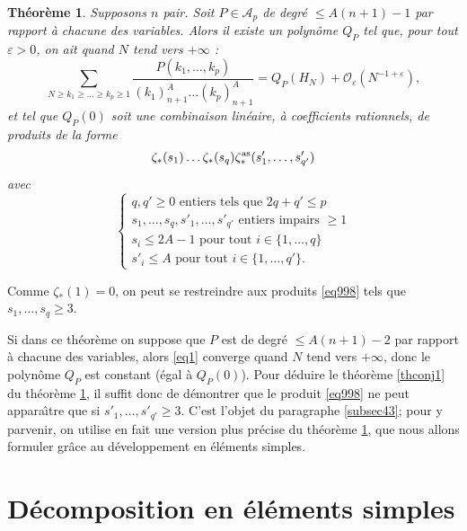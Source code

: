 \documentclass[12pt,francais, reqno]{smfart}
\numberwithin{equation}{section}
\newcommand{\gdo}{\mathcal{O}}
\newcommand{\eps}{\varepsilon}
\newcommand{\unq}{\{1,\ldots, q\}}
\newcommand{\unqpr}{\{1,\ldots, q'\}}
\newcommand{\zetaetoile}{\zeta _*}
\newcommand{\zetaetoileantisym}{\zeta _* ^{{\rm as}}}
\newtheorem{Th}{Th\'eor\`eme}
\begin{document}
\begin{Th} \label{thconj2}
Supposons $n$ pair. 
Soit $P \in \mathscr{A}_p$ de degr\'e $\leq A(n+1)-1$ par rapport \`a chacune des variables. Alors il existe un polyn\^ome $Q_P$ tel que, pour tout $\eps > 0$, on ait quand $N$ tend vers $+\infty$ : 
\begin{equation} \label{eq1}
 \sum_{N \geq k_1 \geq \ldots \geq k_p \geq 1} 
\frac{P(k_1,\ldots,k_p)}{(k_1)_{n+1}^A \ldots (k_p)_{n+1}^A}
= Q_P (H_N) + \gdo_\eps (N^{-1+\eps}),
\end{equation}
et tel que $Q_P(0)$ soit  une combinaison lin\'eaire, \`a coefficients rationnels,
de produits de la forme
\begin{equation} \label{eq998}
\zetaetoile(s_1) \ldots  \zetaetoile(s_{q}) \zetaetoileantisym (s'_{1}, \ldots, s'_{q'})
\end{equation}
avec 
$$
\left\{
\begin{array}{l}
q, q' \geq 0 \mbox{ entiers tels que } 2q+q' \leq p \\
s_1, \ldots, s_q , s'_1, \ldots, s'_{q'} \mbox{ entiers impairs } \geq 1 \\
s_i \leq 2A-1  \mbox{ pour tout } i \in \unq \\
s'_i \leq A  \mbox{ pour tout }  i \in \unqpr .
\end{array}
\right.
$$
\end{Th}

Comme $\zetaetoile(1) = 0$, on peut se restreindre aux produits \eqref{eq998} tels que $s_1, \ldots, s_{q} \geq 3$. 

\bigskip

Si dans ce th\'eor\`eme on suppose que $P$ est de degr\'e $\leq A(n+1)-2$ par rapport \`a chacune des variables, alors \eqref{eq1} converge quand $N$ tend vers $+\infty$, donc le polyn\^ome $Q_P$ est constant (\'egal \`a $Q_P(0)$). Pour d\'eduire le th\'eor\`eme \ref{thconj1} du th\'eor\`eme \ref{thconj2}, il suffit donc de d\'emontrer que le produit \eqref{eq998} ne peut appara\^{\i}tre que si $ s'_1, \ldots, s'_{q'} \geq 3$.  C'est l'objet du paragraphe \ref{subsec43}; pour y parvenir, on utilise en fait une version plus pr\'ecise  du  th\'eor\`eme \ref{thconj2}, que nous allons formuler gr\^ace au d\'eveloppement en \'el\'ements simples. 




\section{D\'ecomposition en \'el\'ements simples} \label{sec4}
\end{document}

